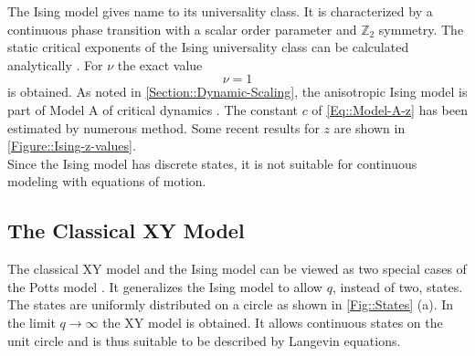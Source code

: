 	The Ising model gives name to its universality class. It is characterized by a continuous phase transition with a scalar order parameter and $\mathbb{Z}_2$ symmetry. The static critical exponents of the Ising universality class can be calculated analytically \cite{cardy1996scaling}. For $\nu$ the exact value
	\begin{equation}
		\nu =	1
	\end{equation}
	is obtained. As noted in \autoref{Section::Dynamic-Scaling}, the anisotropic Ising model is part of Model A of critical dynamics \cite{hohenberg1977theory}. The constant $c$ of \autoref{Eq::Model-A-z} has been estimated by numerous method. Some recent results for $z$ are shown in \autoref{Figure::Ising-z-values}. \\
 
	Since the Ising model has discrete states, it is not suitable for continuous modeling with equations of motion.
	\subsection{The Classical XY Model}
	The classical XY model and the Ising model can be viewed as two special cases of the Potts model \cite{potts1952some}. It generalizes the Ising model to allow $q$, instead of two, states. The states are uniformly distributed on a circle as shown in \autoref{Fig::States} (a). In the limit $q \rightarrow \infty$ the XY model is obtained. It allows continuous states on the unit circle and is thus suitable to be described by Langevin equations. \\
	
